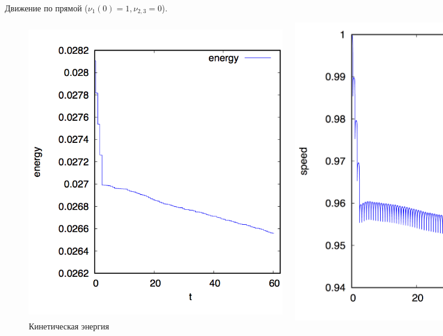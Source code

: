 \documentclass{beamer}
\begin{document}
\begin{frame}{Движение по прямой ($\nu_1(0) = 1, \nu_{2,3} = 0$).}
    \begin{figure}[H]
        \centering
        \begin{columns}
                \centering
                \includegraphics[width=1.1\linewidth]{content/pic/straight_60/kin_en.png}
                \vspace{-15pt}
                \caption{Кинетическая энергия}
                \centering
                \includegraphics[width=0.8\linewidth]{content/pic/straight_60/v.png}

\end{columns}
\end{figure}
\end{frame}
\end{document}
